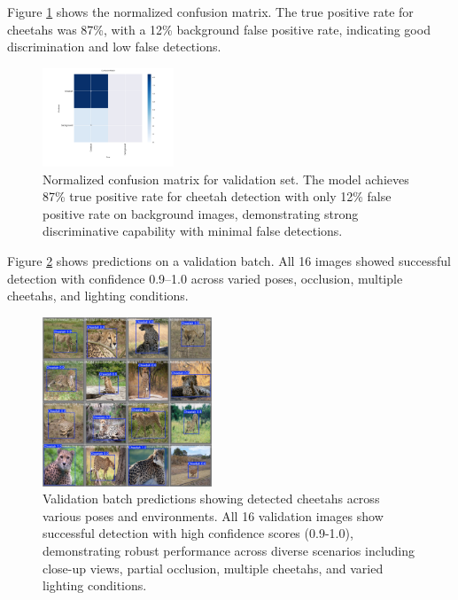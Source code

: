 \documentclass[conference]{IEEEtran}
\begin{document}
Figure \ref{fig:confusion} shows the normalized confusion matrix. The true positive rate for cheetahs was 87\%, with a 12\% background false positive rate, indicating good discrimination and low false detections.

\begin{figure}[htbp]
\centerline{\includegraphics[width=0.35\textwidth]{confusion_matrix.png}}
\caption{Normalized confusion matrix for validation set. The model achieves 87\% true positive rate for cheetah detection with only 12\% false positive rate on background images, demonstrating strong discriminative capability with minimal false detections.}
\label{fig:confusion}
\end{figure}

Figure \ref{fig:validation_batch} shows predictions on a validation batch. All 16 images showed successful detection with confidence 0.9–1.0 across varied poses, occlusion, multiple cheetahs, and lighting conditions.

\begin{figure}[htbp]
\centerline{\includegraphics[width=0.45\textwidth]{validation_predictions.png}}
\caption{Validation batch predictions showing detected cheetahs across various poses and environments. All 16 validation images show successful detection with high confidence scores (0.9-1.0), demonstrating robust performance across diverse scenarios including close-up views, partial occlusion, multiple cheetahs, and varied lighting conditions.}
\label{fig:validation_batch}
\end{figure}
\end{document}
